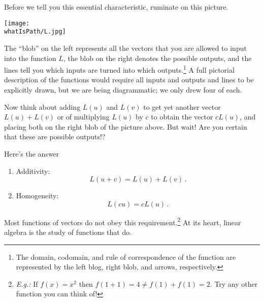 Before we tell you this essential characteristic, 
ruminate on this picture. 

\begin{center}
\texttt{[image: \\whatIsPath/L.jpg]}
\end{center}

The ``blob'' on the left represents all the vectors that you are allowed to input into the function $L$,  the blob on the right denotes the
possible outputs, and the lines tell you which inputs are turned into which outputs.\footnote{The domain, codomain, and rule of correspondence of the function are represented by the left blog, right blob, and arrows, respectively.} A full pictorial description of the functions would require all inputs and outputs and lines to be explicitly drawn, but we are being diagrammatic; we only drew four of each.  




Now think about adding $L(u)$ and $L(v)$ to get yet another vector $L(u)+L(v)$ or of multiplying $L(u)$ by $c$ to obtain the vector $cL(u)$, and placing both on the right blob of the picture above. 
But wait! Are you certain that these are possible outputs!?

Here's the answer 
\begin{center}
\end{center}
\begin{enumerate}
\item Additivity:
\[L(u+v)=L(u)+L(v)\, .\]
\item Homogeneity:
\[L(cu)=cL(u)\, .\]
\end{enumerate}

\noindent Most functions of vectors do not obey this requirement.\!\footnote{{\itshape E.g.:} If $f(x)=x^2$ then $f(1+1)=4 \neq f(1)+f(1)=2$. Try any other function you can think of!}  At its heart, linear algebra is the study of functions that do. 

